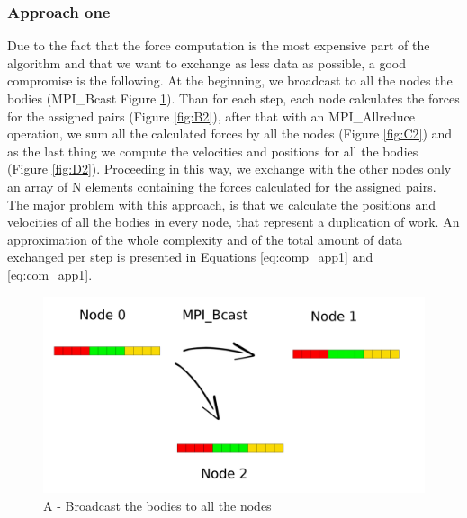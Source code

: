 \documentclass[a4paper]{article}
\begin{document}
\subsubsection{Approach one}
\label{sec:app_1}
Due to the fact that the force computation is the most expensive part of the algorithm and that we want to exchange as less data as possible, a good compromise is the following. At the beginning, we broadcast to all the nodes the bodies (MPI\_Bcast Figure \ref{fig:A2}). Than for each step, each node calculates the forces for the assigned pairs (Figure \ref{fig:B2}), after that with an MPI\_Allreduce operation, we sum all the calculated forces by all the nodes (Figure \ref{fig:C2}) and as the last thing we compute the velocities and positions for all the bodies (Figure \ref{fig:D2}). Proceeding in this way, we exchange with the other nodes only an array of N elements containing the forces calculated for the assigned pairs. The major problem with this approach, is that we calculate the positions and velocities of all the bodies in every node, that represent a duplication of work. An approximation of the whole complexity and of the total amount of data exchanged per step is presented in Equations \ref{eq:comp_app1} and \ref{eq:com_app1}.\\

\begin{figure}[ht]
  \centering
  \includegraphics[width=0.5\linewidth]{broadcast}
  \caption{A - Broadcast the bodies to all the nodes}
  \label{fig:A2}
\end{figure}
\FloatBarrier
\end{document}

